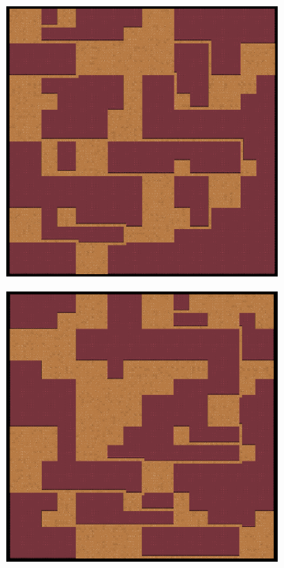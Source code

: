\begin{figure}[H]
\begin{subfigure}{.5\textwidth}
  \centering
  \includegraphics[width=.8\linewidth]{../images/pcg_quadtree/pcg1.png}
  \label{fig:sfig1}
\end{subfigure}%
\begin{subfigure}{.5\textwidth}
  \centering
  \includegraphics[width=.8\linewidth]{../images/pcg_quadtree/pcg2.png}
  \label{fig:sfig2}
\end{subfigure}
\begin{subfigure}{.5\textwidth}
  \centering

\end{subfigure}
\end{figure}
